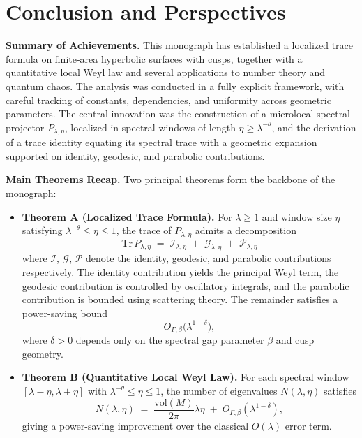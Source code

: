 \section*{Conclusion and Perspectives}

\noindent\textbf{Summary of Achievements.}
This monograph has established a localized trace formula on finite-area hyperbolic surfaces with cusps, together with a quantitative local Weyl law and several applications to number theory and quantum chaos. The analysis was conducted in a fully explicit framework, with careful tracking of constants, dependencies, and uniformity across geometric parameters. The central innovation was the construction of a microlocal spectral projector $P_{\lambda,\eta}$, localized in spectral windows of length $\eta \geq \lambda^{-\theta}$, and the derivation of a trace identity equating its spectral trace with a geometric expansion supported on identity, geodesic, and parabolic contributions.

\medskip
\noindent\textbf{Main Theorems Recap.}
Two principal theorems form the backbone of the monograph:
\begin{itemize}
  \item \textbf{Theorem A (Localized Trace Formula).} For $\lambda \geq 1$ and window size $\eta$ satisfying $\lambda^{-\theta} \leq \eta \leq 1$, the trace of $P_{\lambda,\eta}$ admits a decomposition
  \[
    \mathrm{Tr}\, P_{\lambda,\eta} \;=\; \mathcal{I}_{\lambda,\eta} \;+\; \mathcal{G}_{\lambda,\eta} \;+\; \mathcal{P}_{\lambda,\eta}
  \]
  where $\mathcal{I}$, $\mathcal{G}$, $\mathcal{P}$ denote the identity, geodesic, and parabolic contributions respectively. The identity contribution yields the principal Weyl term, the geodesic contribution is controlled by oscillatory integrals, and the parabolic contribution is bounded using scattering theory. The remainder satisfies a power-saving bound
  \[
    O_{\Gamma,\beta}\bigl(\lambda^{1-\delta}\bigr),
  \]
  where $\delta>0$ depends only on the spectral gap parameter $\beta$ and cusp geometry.
  \item \textbf{Theorem B (Quantitative Local Weyl Law).} For each spectral window $[\lambda-\eta,\lambda+\eta]$ with $\lambda^{-\theta}\leq\eta\leq 1$, the number of eigenvalues $N(\lambda,\eta)$ satisfies
  \[
    N(\lambda,\eta) \;=\; \frac{\mathrm{vol}(M)}{2\pi} \lambda \eta \;+\; O_{\Gamma,\beta}\!\left(\lambda^{1-\delta}\right),
  \]
  giving a power-saving improvement over the classical $O(\lambda)$ error term.
\end{itemize}

